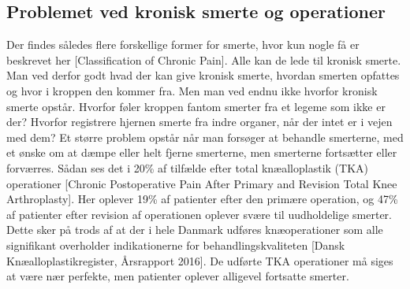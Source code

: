 \subsection{Problemet ved kronisk smerte og operationer}
Der findes således flere forskellige former for smerte, hvor kun nogle få er beskrevet her [Classification of Chronic Pain]. Alle kan de lede til kronisk smerte. Man ved derfor godt hvad der kan give kronisk smerte, hvordan smerten opfattes og hvor i kroppen den kommer fra. Men man ved endnu ikke hvorfor kronisk smerte opstår. Hvorfor føler kroppen fantom smerter fra et legeme som ikke er der? Hvorfor registrere hjernen smerte fra indre organer, når der intet er i vejen med dem? Et større problem opstår når man forsøger at behandle smerterne, med et ønske om at dæmpe eller helt fjerne smerterne, men smerterne fortsætter eller forværres. Sådan ses det i 20\% af tilfælde efter total knæalloplastik (TKA) operationer [Chronic Postoperative Pain After Primary and Revision Total Knee Arthroplasty]. Her oplever 19\% af patienter efter den primære operation, og 47\% af patienter efter revision af operationen oplever svære til uudholdelige smerter. Dette sker på trods af at der i hele Danmark udføres knæoperationer som alle signifikant overholder indikationerne for behandlingskvaliteten [Dansk Knæalloplastikregister, Årsrapport 2016]. De udførte TKA operationer må siges at være nær perfekte, men patienter oplever alligevel fortsatte smerter. 


